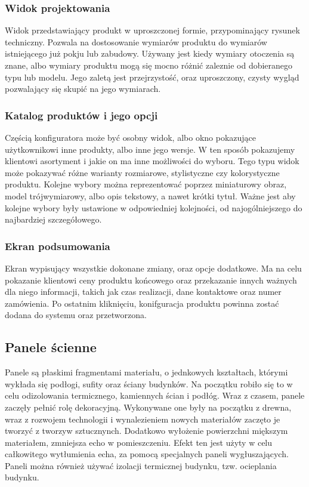 \documentclass{article} %
\begin{document}
        \subsubsection{Widok projektowania}
        Widok przedstawiający produkt w uproszczonej formie, przypominający rysunek techniczny. Pozwala na dostosowanie wymiarów produktu do wymiarów istniejącego już pokju lub zabudowy. Używany jest kiedy wymiary otoczenia są znane, albo wymiary produktu mogą się mocno różnić zaleznie od dobieranego typu lub modelu. Jego zaletą jest przejrzystość, oraz uproszczony, czysty wygląd pozwalający się skupić na jego wymiarach.
        \\
        
        \subsubsection{Katalog produktów i jego opcji}
        Częścią konfiguratora może być osobny widok, albo okno pokazujące użytkownikowi inne produkty, albo inne jego wersje. W ten sposób pokazujemy klientowi asortyment i jakie on ma inne możliwości do wyboru. Tego typu widok może pokazywać różne warianty rozmiarowe, stylistyczne czy kolorystyczne produktu. Kolejne wybory można reprezentować poprzez miniaturowy obraz, model trójwymiarowy, albo opis tekstowy, a nawet krótki tytuł. Ważne jest aby kolejne wybory były ustawione w odpowiedniej kolejności, od najogólniejszego do najbardziej szczegółowego.
        \\
        
        \subsubsection{Ekran podsumowania}
        Ekran wypisujący wszystkie dokonane zmiany, oraz opcje dodatkowe. Ma na celu pokazanie klientowi ceny produktu końcowego oraz przekazanie innych ważnych dla niego informacji, takich jak czas realizacji, dane kontaktowe oraz numer zamówienia. Po ostatnim kliknięciu, konifguracja produktu powinna zostać dodana do systemu oraz przetworzona.
        \\
        
        
    \subsection{Panele ścienne}
        Panele są płaskimi fragmentami materiału, o jednkowych kształtach, którymi wykłada się podłogi, sufity oraz ściany budynków. Na początku robiło się to w celu odizolowania termicznego, kamiennych ścian i podłóg. Wraz z czasem, panele zaczęły pełnić rolę dekoracyjną. Wykonywane one były na początku z drewna, wraz z rozwojem technologii i wynalezieniem nowych materiałów zaczęto je tworzyć z tworzyw sztucznynch. Dodatkowo wyłożenie powierzchni miększym materiałem, zmniejsza echo w pomieszczeniu. Efekt ten jest użyty w celu całkowitego wytłumienia echa, za pomocą specjalnych paneli wygłuszających. Paneli można również używać izolacji termicznej budynku, tzw. ocieplania budynku. 
        \\
        
\end{document}
